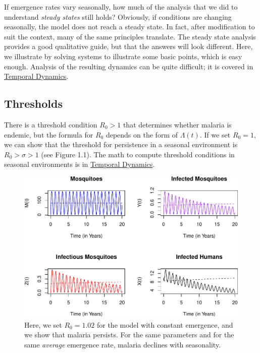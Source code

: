 \documentclass[
]{book}
\begin{document}
If emergence rates vary seasonally, how much of the analysis that we did to understand \emph{steady states} still holds? Obviously, if conditions are changing seasonally, the model does not reach a steady state. In fact, after modification to suit the context, many of the same principles translate. The steady state analysis provides a good qualitative guide, but that the answers will look different. Here, we illustrate by solving systems to illustrate some basic points, which is easy enough. Analysis of the resulting dynamics can be quite difficult; it is covered in \hyperref[temporal-dynamics]{Temporal Dynamics}.

\subsection{Thresholds}\label{thresholds-2}

There is a threshold condition \(R_0>1\) that determines whether malaria is endemic, but the formula for \(R_0\) depends on the form of \(\Lambda(t)\). If we set \(R_0=1\), we can show that the threshold for persistence in a seasonal environment is \(R_0 > \sigma > 1\) (see Figure 1.1). The math to compute threshold conditions in seasonal environments is in \hyperref[temporal-dynamics]{Temporal Dynamics}.

\begin{figure}
\centering
\includegraphics{docs/figs/unnamed-chunk-84-1.pdf}
\caption{\label{fig:unnamed-chunk-84}Here, we set \(R_0= 1.02\) for the model with constant emergence, and we show that malaria persists. For the same parameters and for the same \emph{average} emergence rate, malaria declines with seasonality.}
\end{figure}
\end{document}
